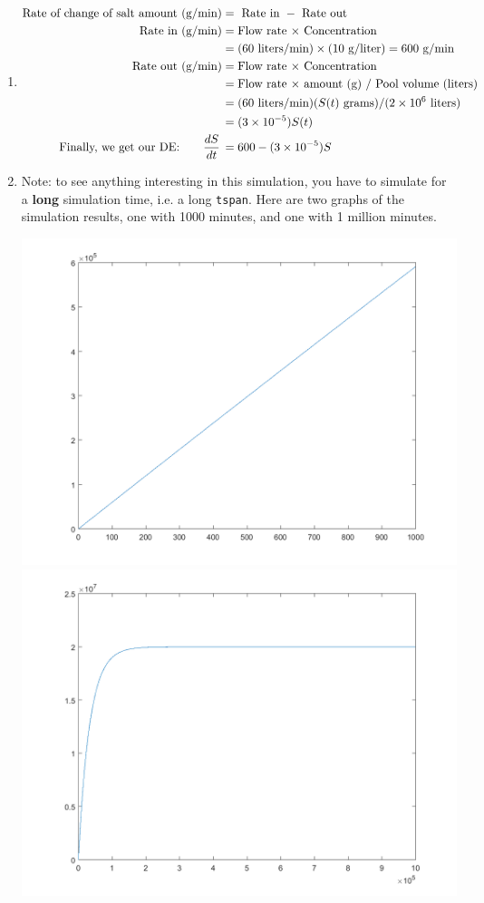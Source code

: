 \begin{enumerate}[1.]
\begin{Solution}
\begin{enumerate}
\item 
\begin{align*}
  \text{Rate of change of salt amount (g/min)} & = \text{ Rate in } - \text{ Rate out }  \\
  \text{Rate in (g/min)} & = \text{Flow rate $\times$ Concentration} \\
  & = (60 \text{ liters/min}) \times (10 \text{ g/liter}) = 600 \text{ g/min} \\
  \text{Rate out (g/min)} & = \text{Flow rate $\times$ Concentration}  \\
  & =\text{Flow rate $\times$ amount (g) / Pool volume (liters)} \\
  & = (60 \text{ liters/min}) (S(t) \text{ grams}) / (2 \times 10^6 \text{ liters}) \\
  & = (3 \times 10^{-5}) S(t) \\
  \text{Finally, we get our DE: } ~~~~~ \frac{d {S}}{dt} \, &= 600 - (3 \times 10^{-5}) S \\
\end{align*}

\item Note: to see anything interesting in this simulation, you have
  to simulate for a {\bf long} simulation time, i.e. a long
  \verb#tspan#.  Here are two graphs of the simulation results, one
  with 1000 minutes, and one with 1 million minutes.

\includegraphics[width=0.45\linewidth]{graphics/Week09_Pendulum/single_tank_1a} \hfill
\includegraphics[width=0.45\linewidth]{graphics/Week09_Pendulum/single_tank_1b} 


\end{enumerate}
\end{Solution}
\end{enumerate}
